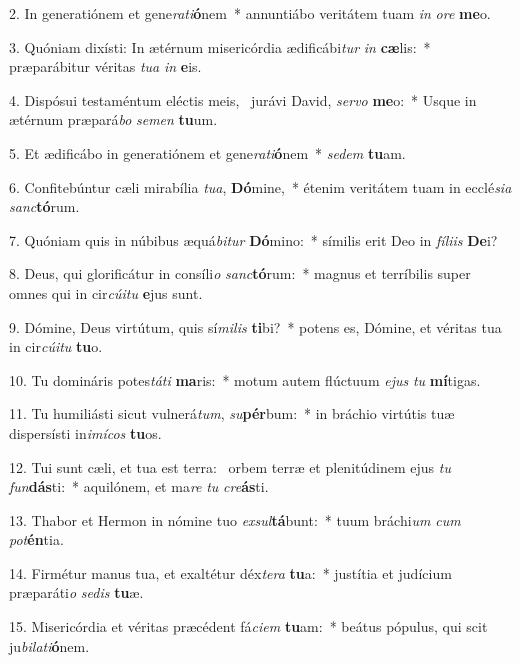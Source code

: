2. In generatiónem et gene\textit{ra}\textit{ti}\textbf{ó}nem~*  annuntiábo veritátem tuam \textit{in} \textit{o}\textit{re} \textbf{me}o.\

3. Quóniam dixísti: In ætérnum misericórdia ædificábi\textit{tur} \textit{in} \textbf{cæ}lis:~*  præparábitur véritas \textit{tu}\textit{a} \textit{in} \textbf{e}is.\

4. Dispósui testaméntum eléctis meis, \dag\  jurávi David, \textit{ser}\textit{vo} \textbf{me}o:~*  Usque in ætérnum præpará\textit{bo} \textit{se}\textit{men} \textbf{tu}um.\

5. Et ædificábo in generatiónem et gene\textit{ra}\textit{ti}\textbf{ó}nem~*  \textit{se}\textit{dem} \textbf{tu}am.\

6. Confitebúntur cæli mirabília \textit{tu}\textit{a}, \textbf{Dó}mine,~*  étenim veritátem tuam in ecclé\textit{si}\textit{a} \textit{sanc}\textbf{tó}rum.\

7. Quóniam quis in núbibus æquá\textit{bi}\textit{tur} \textbf{Dó}mino:~*  símilis erit Deo in \textit{fí}\textit{li}\textit{is} \textbf{De}i?\

8. Deus, qui glorificátur in consíli\textit{o} \textit{sanc}\textbf{tó}rum:~*  magnus et terríbilis super omnes qui in cir\textit{cú}\textit{i}\textit{tu} \textbf{e}jus sunt.\

9. Dómine, Deus virtútum, quis sí\textit{mi}\textit{lis} \textbf{ti}bi?~*  potens es, Dómine, et véritas tua in cir\textit{cú}\textit{i}\textit{tu} \textbf{tu}o.\

10. Tu domináris potes\textit{tá}\textit{ti} \textbf{ma}ris:~*  motum autem flúctuum \textit{e}\textit{jus} \textit{tu} \textbf{mí}tigas.\

11. Tu humiliásti sicut vulnerá\textit{tum}, \textit{su}\textbf{pér}bum:~*  in bráchio virtútis tuæ dispersísti in\textit{i}\textit{mí}\textit{cos} \textbf{tu}os.\

12. Tui sunt cæli, et tua est terra: \dag\  orbem terræ et plenitúdinem ejus \textit{tu} \textit{fun}\textbf{dás}ti:~*  aquilónem, et ma\textit{re} \textit{tu} \textit{cre}\textbf{ás}ti.\

13. Thabor et Hermon in nómine tuo \textit{ex}\textit{sul}\textbf{tá}bunt:~*  tuum bráchi\textit{um} \textit{cum} \textit{pot}\textbf{én}tia.\

14. Firmétur manus tua, et exaltétur déx\textit{te}\textit{ra} \textbf{tu}a:~*  justítia et judícium præparáti\textit{o} \textit{se}\textit{dis} \textbf{tu}æ.\

15. Misericórdia et véritas præcédent fá\textit{ci}\textit{em} \textbf{tu}am:~*  beátus pópulus, qui scit ju\textit{bi}\textit{la}\textit{ti}\textbf{ó}nem.\

